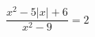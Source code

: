 \begin{ex}[type=equation]
	\begin{condition}
		$\dfrac{x^2 - 5\big|x\big| + 6}{x^2 - 9} = 2$
	\end{condition}
	\answer{$\varnothing$}
\end{ex}